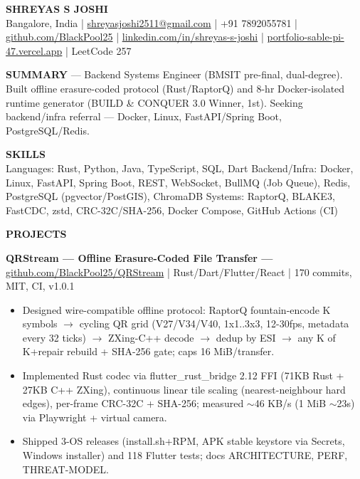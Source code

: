 \documentclass[10pt,a4paper]{article}
\begin{document}
\begin{center}
{\Large\bfseries SHREYAS S JOSHI} \\[2pt]
\small Bangalore, India |
\href{mailto:shreyasjoshi2511@gmail.com}{shreyasjoshi2511@gmail.com} |
+91 7892055781 |
\href{https://github.com/BlackPool25}{github.com/BlackPool25} |
\href{https://www.linkedin.com/in/shreyas-s-joshi}{linkedin.com/in/shreyas-s-joshi} |
\href{https://portfolio-sable-pi-47.vercel.app}{portfolio-sable-pi-47.vercel.app} |
LeetCode 257
\end{center}
\vspace{-6pt}
\noindent\textbf{SUMMARY} — Backend Systems Engineer (BMSIT pre-final, dual-degree). Built offline erasure-coded protocol (Rust/RaptorQ) and 8-hr Docker-isolated runtime generator (BUILD \& CONQUER 3.0 Winner, 1st). Seeking backend/infra referral — Docker, Linux, FastAPI/Spring Boot, PostgreSQL/Redis.
\vspace{4pt}

\noindent\textbf{SKILLS} \\
\small Languages: Rust, Python, Java, TypeScript, SQL, Dart \quad
Backend/Infra: Docker, Linux, FastAPI, Spring Boot, REST, WebSocket, BullMQ (Job Queue), Redis, PostgreSQL (pgvector/PostGIS), ChromaDB \quad
Systems: RaptorQ, BLAKE3, FastCDC, zstd, CRC-32C/SHA-256, Docker Compose, GitHub Actions (CI)

\vspace{6pt}
\noindent\textbf{PROJECTS}
\vspace{2pt}

\noindent\textbf{QRStream — Offline Erasure-Coded File Transfer —} \href{https://github.com/BlackPool25/QRStream}{github.com/BlackPool25/QRStream} | Rust/Dart/Flutter/React | 170 commits, MIT, CI, v1.0.1
\begin{itemize}[leftmargin=12pt, itemsep=1pt, topsep=1pt]
\item Designed wire-compatible offline protocol: RaptorQ fountain-encode K symbols $\rightarrow$ cycling QR grid (V27/V34/V40, 1x1..3x3, 12-30fps, metadata every 32 ticks) $\rightarrow$ ZXing-C++ decode $\rightarrow$ dedup by ESI $\rightarrow$ any K of K+repair rebuild + SHA-256 gate; caps 16 MiB/transfer.
\item Implemented Rust codec via flutter\_rust\_bridge 2.12 FFI (71KB Rust + 27KB C++ ZXing), continuous linear tile scaling (nearest-neighbour hard edges), per-frame CRC-32C + SHA-256; measured $\sim$46 KB/s (1 MiB $\sim$23s) via Playwright + virtual camera.
\item Shipped 3-OS releases (install.sh+RPM, APK stable keystore via Secrets, Windows installer) and 118 Flutter tests; docs ARCHITECTURE, PERF, THREAT-MODEL.
\end{itemize}
\end{document}
